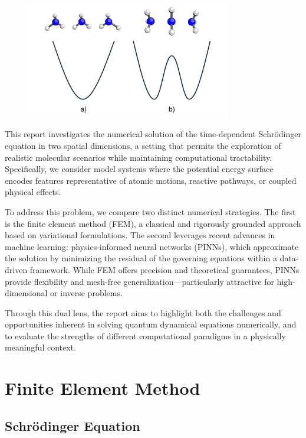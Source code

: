\documentclass{article}
\theoremstyle{definition}
\theoremstyle{plain}
\theoremstyle{remark}
\begin{document}
\begin{figure}[h]
    \centering
    \includegraphics[width=0.8\textwidth]{figures/Figure2.pdf}
    \caption{}
    \label{fig:fig2}
\end{figure}

This report investigates the numerical solution of the time-dependent Schrödinger equation in two spatial dimensions, a setting that permits the exploration of realistic molecular scenarios while maintaining computational tractability. Specifically, we consider model systems where the potential energy surface encodes features representative of atomic motions, reactive pathways, or coupled physical effects.

To address this problem, we compare two distinct numerical strategies. The first is the finite element method (FEM), a classical and rigorously grounded approach based on variational formulations. The second leverages recent advances in machine learning: physics-informed neural networks (PINNs), which approximate the solution by minimizing the residual of the governing equations within a data-driven framework. While FEM offers precision and theoretical guarantees, PINNs provide flexibility and mesh-free generalization—particularly attractive for high-dimensional or inverse problems.

Through this dual lens, the report aims to highlight both the challenges and opportunities inherent in solving quantum dynamical equations numerically, and to evaluate the strengths of different computational paradigms in a physically meaningful context.

\section{Finite Element Method}

\subsection*{Schrödinger Equation}
\end{document}
